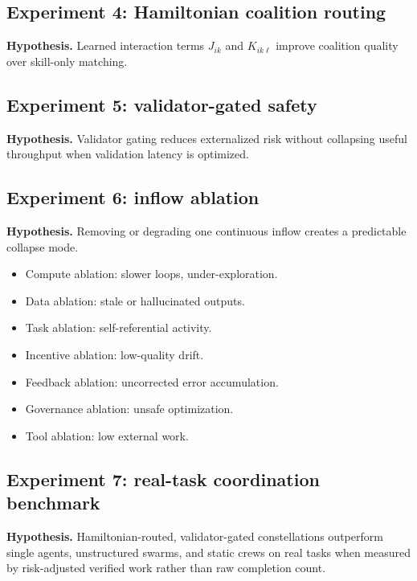 \documentclass[
  11pt,
]{article}
\providecommand{\tightlist}{%
  \setlength{\itemsep}{0pt}\setlength{\parskip}{0pt}}
\begin{document}
\subsection{Experiment 4: Hamiltonian coalition
routing}\label{experiment-4-hamiltonian-coalition-routing}

\textbf{Hypothesis.} Learned interaction terms \(J_{ik}\) and
\(K_{ik\ell}\) improve coalition quality over skill-only matching.

\subsection{Experiment 5: validator-gated
safety}\label{experiment-5-validator-gated-safety}

\textbf{Hypothesis.} Validator gating reduces externalized risk without
collapsing useful throughput when validation latency is optimized.

\subsection{Experiment 6: inflow
ablation}\label{experiment-6-inflow-ablation}

\textbf{Hypothesis.} Removing or degrading one continuous inflow creates
a predictable collapse mode.

\begin{itemize}
\tightlist
\item
  Compute ablation: slower loops, under-exploration.
\item
  Data ablation: stale or hallucinated outputs.
\item
  Task ablation: self-referential activity.
\item
  Incentive ablation: low-quality drift.
\item
  Feedback ablation: uncorrected error accumulation.
\item
  Governance ablation: unsafe optimization.
\item
  Tool ablation: low external work.
\end{itemize}

\subsection{Experiment 7: real-task coordination
benchmark}\label{experiment-7-real-task-coordination-benchmark}

\textbf{Hypothesis.} Hamiltonian-routed, validator-gated constellations
outperform single agents, unstructured swarms, and static crews on real
tasks when measured by risk-adjusted verified work rather than raw
completion count.
\end{document}
